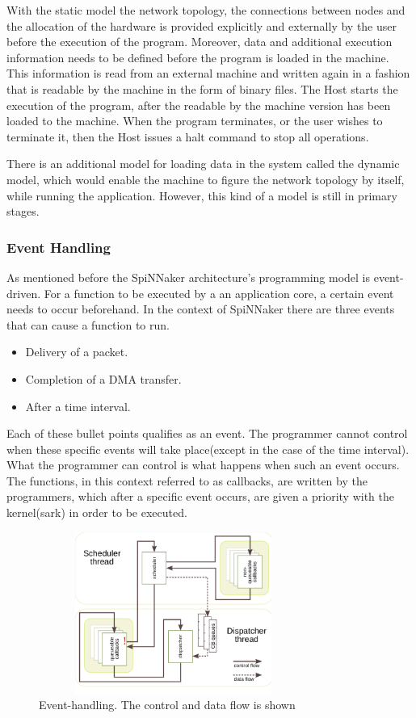 \documentclass[12pt,a4paper]{article}
\begin{document}
With the static model the network topology, the connections between nodes and the allocation of the hardware is provided explicitly and externally by the user before the execution of the program. Moreover, data and additional execution information needs to be defined before the program is loaded in the machine. This information is read from an external machine and written again in a fashion that is readable by the machine in the form of binary files. The Host starts the execution of the program, after the readable by the machine version has been loaded to the machine. When the program terminates, or the user wishes to terminate it, then the Host issues a halt command to stop all operations\cite{docfile}.

There is an additional model for loading data in the system called the dynamic model, which would enable the machine to figure the network topology by itself, while running the application. However, this kind of a model is still in primary stages\cite{docfile}.
\subsubsection{Event Handling}
As mentioned before the SpiNNaker architecture's programming model is event-driven. For a function to be executed by a an application core, a certain event needs to occur beforehand. In the context of SpiNNaker there are three events that can cause a function to run.
\begin{itemize}
\item Delivery of a packet.
\item Completion of a DMA transfer.
\item After a time interval.
\end{itemize}
Each of these bullet points qualifies as an event. The programmer cannot control when these specific events will take place(except in the case of the time interval). What the programmer can control is what happens when such an event occurs. The functions, in this context referred to as callbacks, are written by the programmers, which after a specific event occurs, are given a priority with the kernel(sark) in order to be executed. 
\begin{figure}[h!]
\includegraphics[width=250pt,height=150pt,scale=2]{Pics/event-handling.png}
\centering
\caption{Event-handling. The control and data flow is shown\cite{sharp2011event}}
\end{figure}
\end{document}
